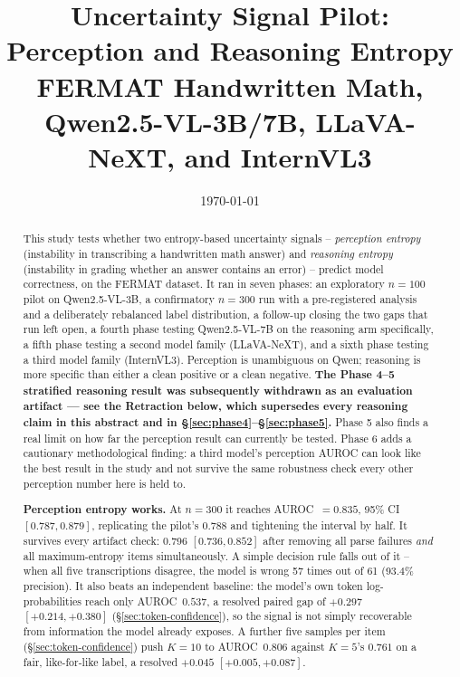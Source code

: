 \documentclass[11pt]{article}
\title{Uncertainty Signal Pilot: Perception and Reasoning Entropy\\
\large FERMAT Handwritten Math, Qwen2.5-VL-3B/7B, LLaVA-NeXT, and InternVL3}
\author{}
\date{\today}
\begin{document}
\maketitle

\begin{abstract}
This study tests whether two entropy-based uncertainty signals -- \emph{perception
entropy} (instability in transcribing a handwritten math answer) and
\emph{reasoning entropy} (instability in grading whether an answer contains an
error) -- predict model correctness, on the FERMAT dataset. It ran in seven
phases: an exploratory $n=100$ pilot on Qwen2.5-VL-3B, a confirmatory
$n=300$ run with a pre-registered analysis and a deliberately rebalanced
label distribution, a follow-up closing the two gaps that run left open, a
fourth phase testing Qwen2.5-VL-7B on the reasoning arm specifically, a
fifth phase testing a second model family (LLaVA-NeXT), and a sixth phase
testing a third model family (InternVL3). Perception is unambiguous on
Qwen; reasoning is more specific than either a clean positive or a clean
negative. \textbf{The Phase 4--5 stratified reasoning result was subsequently
withdrawn as an evaluation artifact --- see the Retraction below, which
supersedes every reasoning claim in this abstract and in
\S\ref{sec:phase4}--\S\ref{sec:phase5}.} Phase 5 also finds a real limit on
how far the perception result can currently be tested. Phase 6 adds a cautionary
methodological finding: a third model's perception AUROC can look like the
best result in the study and not survive the same robustness check every
other perception number here is held to.

\textbf{Perception entropy works.} At $n=300$ it reaches AUROC~$=0.835$,
95\% CI $[0.787, 0.879]$, replicating the pilot's 0.788 and tightening the
interval by half. It survives every artifact check: 0.796 $[0.736, 0.852]$
after removing all parse failures \emph{and} all maximum-entropy items
simultaneously. A simple decision rule falls out of it -- when all five
transcriptions disagree, the model is wrong 57 times out of 61 (93.4\%
precision). It also beats an independent baseline: the model's own token
log-probabilities reach only AUROC~$0.537$, a resolved paired gap of
$+0.297$ $[+0.214, +0.380]$ (\S\ref{sec:token-confidence}), so the signal is
not simply recoverable from information the model already exposes. A further
five samples per item (\S\ref{sec:token-confidence}) push $K=10$ to
AUROC~$0.806$ against $K=5$'s $0.761$ on a fair, like-for-like label, a
resolved $+0.045$ $[+0.005, +0.087]$.


\end{abstract}
\end{document}
